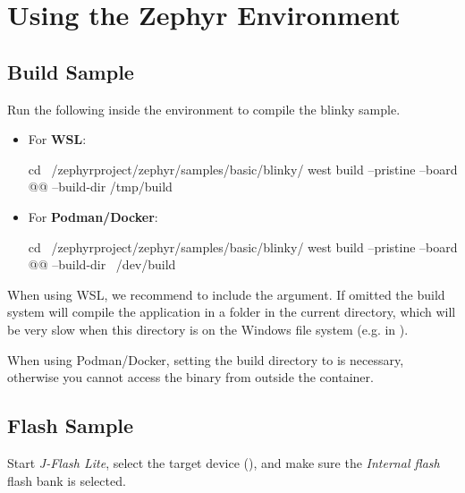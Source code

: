 \section{Using the Zephyr Environment}

\subsection{Build Sample}

Run the following inside the environment to compile the blinky sample.

\begin{itemize}
  \item For \textbf{WSL}:
  \begin{monobox}
cd ~/zephyrproject/zephyr/samples/basic/blinky/
west build --pristine --board @\board{}@ --build-dir /tmp/build
\end{monobox}
  \item For \textbf{Podman/Docker}:
  \begin{monobox}
cd ~/zephyrproject/zephyr/samples/basic/blinky/
west build --pristine --board @\board{}@ --build-dir ~/dev/build
\end{monobox}
\end{itemize}

\begin{infobox}
  When using WSL, we recommend to include the  argument.
  If omitted the build system will compile the application in a  folder in the current directory, which will be very slow when this directory is on the Windows file system (e.g. in ).
\end{infobox}

\begin{infobox}
  When using Podman/Docker, setting the build directory to  is necessary, otherwise you cannot access the binary from outside the container.
\end{infobox}


\newpage

\subsection{Flash Sample}

Start \emph{J-Flash Lite}, select the target device (\texttt{\mcu}), and make sure the \emph{Internal flash} flash bank is selected.

